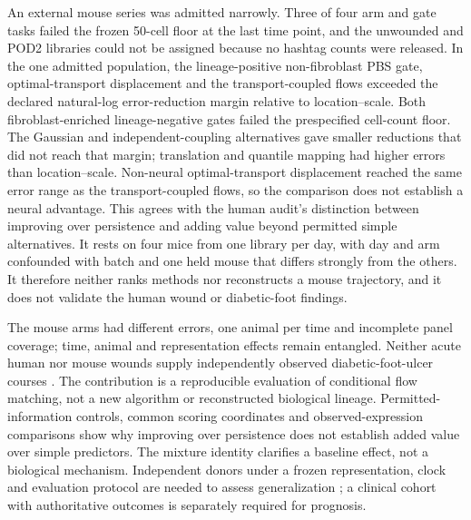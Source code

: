 \documentclass[10pt,a4paper]{article}
\begin{document}
An external mouse series was admitted narrowly. Three of four arm and gate tasks failed the frozen 50-cell floor at the last time point, and the unwounded and POD2 libraries could not be assigned because no hashtag counts were released. In the one admitted population, the lineage-positive non-fibroblast PBS gate, optimal-transport displacement and the transport-coupled flows exceeded the declared natural-log error-reduction margin relative to location--scale. Both fibroblast-enriched lineage-negative gates failed the prespecified cell-count floor. The Gaussian and independent-coupling alternatives gave smaller reductions that did not reach that margin; translation and quantile mapping had higher errors than location--scale. Non-neural optimal-transport displacement reached the same error range as the transport-coupled flows, so the comparison does not establish a neural advantage. This agrees with the human audit's distinction between improving over persistence and adding value beyond permitted simple alternatives. It rests on four mice from one library per day, with day and arm confounded with batch and one held mouse that differs strongly from the others. It therefore neither ranks methods nor reconstructs a mouse trajectory, and it does not validate the human wound or diabetic-foot findings.

The mouse arms had different errors, one animal per time and incomplete panel coverage; time, animal and representation effects remain entangled. Neither acute human nor mouse wounds supply independently observed diabetic-foot-ulcer courses \citep{armstrong2017}. The contribution is a reproducible evaluation of conditional flow matching, not a new algorithm or reconstructed biological lineage. Permitted-information controls, common scoring coordinates and observed-expression comparisons show why improving over persistence does not establish added value over simple predictors. The mixture identity clarifies a baseline effect, not a biological mechanism. Independent donors under a frozen representation, clock and evaluation protocol are needed to assess generalization \citep{roberts2017}; a clinical cohort with authoritative outcomes is separately required for prognosis.
\end{document}
